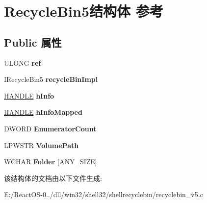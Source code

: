 \hypertarget{struct_recycle_bin5}{}\section{Recycle\+Bin5结构体 参考}
\label{struct_recycle_bin5}
\subsection*{Public 属性}
\begin{DoxyCompactItemize}
\item 
\mbox{\label{struct_recycle_bin5_ae862d1355fea3149c7c2224da5090811}} 
U\+L\+O\+NG {\bfseries ref}
\item 
\mbox{\label{struct_recycle_bin5_a56150b149b48b9bc0f5d3b99f713c36d}} 
I\+Recycle\+Bin5 {\bfseries recycle\+Bin\+Impl}
\item 
\mbox{\label{struct_recycle_bin5_a1d6e824259daeb887209bae4e4baf079}} 
\hyperlink{interfacevoid}{H\+A\+N\+D\+LE} {\bfseries h\+Info}
\item 
\mbox{\label{struct_recycle_bin5_a184d2ed78a4e2891dc3486df17a0a83f}} 
\hyperlink{interfacevoid}{H\+A\+N\+D\+LE} {\bfseries h\+Info\+Mapped}
\item 
\mbox{\label{struct_recycle_bin5_a8fb15e879d5ffbd875f9a7ad0baa8bd6}} 
D\+W\+O\+RD {\bfseries Enumerator\+Count}
\item 
\mbox{\label{struct_recycle_bin5_a229cd14e0e853c7745e2749218a8bc6e}} 
L\+P\+W\+S\+TR {\bfseries Volume\+Path}
\item 
\mbox{\label{struct_recycle_bin5_a7c4a2f6d2ca0e3a4beeca20e0a78b8f1}} 
W\+C\+H\+AR {\bfseries Folder} \mbox{[}A\+N\+Y\+\_\+\+S\+I\+ZE\mbox{]}
\end{DoxyCompactItemize}


该结构体的文档由以下文件生成\+:\begin{DoxyCompactItemize}
\item 
E\+:/\+React\+O\+S-\/0../dll/win32/shell32/shellrecyclebin/recyclebin\+\_\+v5.\+c\end{DoxyCompactItemize}
